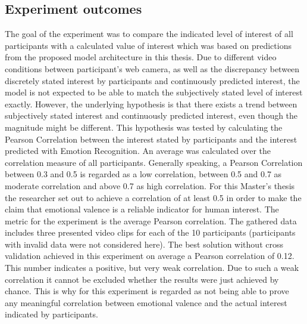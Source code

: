 \subsection{Experiment outcomes}
The goal of the experiment was to compare the indicated level of interest of all participants with a calculated value of interest which was based on predictions from the proposed model architecture in this thesis.
\newline\newline
Due to different video conditions between participant's web camera, as well as the discrepancy between discretely stated interest by participants and continuously predicted interest, the model is not expected to be able to match the subjectively stated level of interest exactly. However, the underlying hypothesis is that there exists a trend between subjectively stated interest and continuously predicted interest, even though the magnitude might be different.
\newline\newline
This hypothesis was tested by calculating the Pearson Correlation between the interest stated by participants and the interest predicted with Emotion Recognition. An average was calculated over the correlation measure of all participants. 
\newline\newline
Generally speaking, a Pearson Correlation between 0.3 and 0.5 is regarded as a low correlation, between 0.5 and 0.7 as moderate correlation and above 0.7 as high correlation. For this Master's thesis the researcher set out to achieve a correlation of at least 0.5 in order to make the claim that emotional valence is a reliable indicator for human interest.
\newline\newline
The metric for the experiment is the average Pearson correlation. The gathered data includes three presented video clips for each of the 10 participants (participants with invalid data were not considered here). The best solution without cross validation achieved in this experiment on average a Pearson correlation of 0.12. This number indicates a positive, but very weak correlation. Due to such a weak correlation it cannot be excluded whether the results were just achieved by chance. This is why for this experiment is regarded as not being able to prove any meaningful correlation between emotional valence and the actual interest indicated by participants.
\newline\newline
